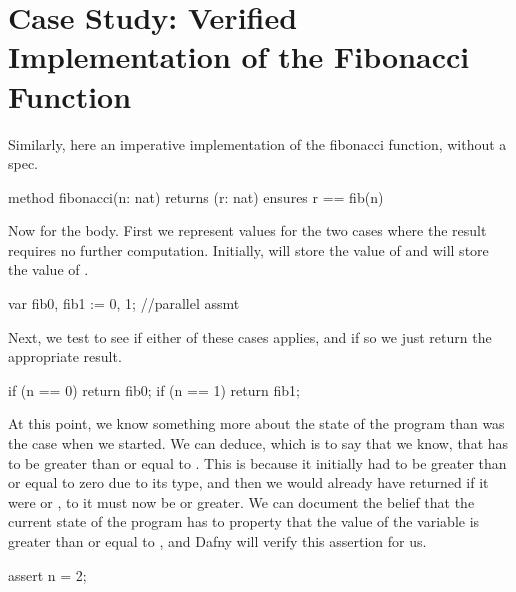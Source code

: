 \documentclass[letterpaper,10pt,english]{sphinxmanual}
\begin{document}
\section{Case Study: Verified Implementation of the Fibonacci Function}
\label{\detokenize{05-putting-it-together:case-study-verified-implementation-of-the-fibonacci-function}}
Similarly, here an imperative implementation of the fibonacci
function, without a spec.

\begin{sphinxVerbatim}[commandchars=\\\{\}]
method fibonacci(n: nat) returns (r: nat)
    ensures r == fib(n)
\end{sphinxVerbatim}

Now for the body. First we represent values for the two
cases where the result requires no further computation.
Initially,  will store the value of  and
 will store the value of .

\begin{sphinxVerbatim}[commandchars=\\\{\}]
var fib0, fib1 := 0, 1; //parallel assmt
\end{sphinxVerbatim}

Next, we test to see if either of these cases applies,
and if so we just return the appropriate result.

\begin{sphinxVerbatim}[commandchars=\\\{\}]
if (n == 0) \PYGZob{} return fib0; \PYGZcb{}
if (n == 1) \PYGZob{} return fib1; \PYGZcb{}
\end{sphinxVerbatim}

At this point, we know something more about the state of the program
than was the case when we started. We can deduce, which is to say that
we know, that  has to be greater than or equal to . This is
because it initially had to be greater than or equal to zero due to
its type, and then we would already have returned if it were  or
, to it must now be  or greater. We can document the belief
that the current state of the program has to property that the value
of the variable  is greater than or equal to , and Dafny will
verify this assertion for us.

\begin{sphinxVerbatim}[commandchars=\\\{\}]
assert n \PYGZgt{}= 2;
\end{sphinxVerbatim}
\end{document}
